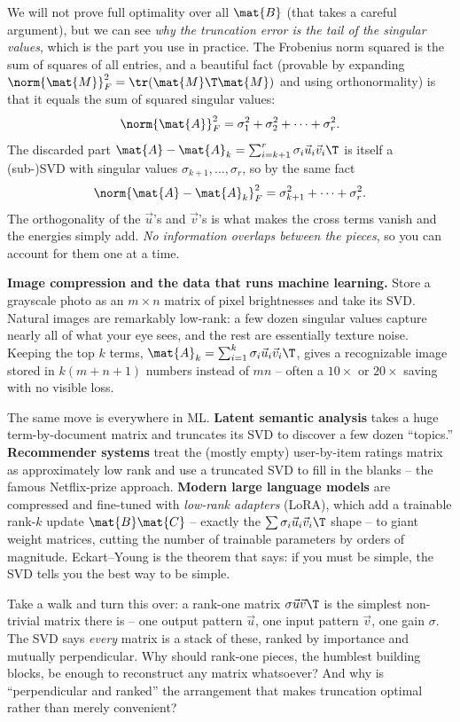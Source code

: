 We will not prove full optimality over all $\mat{B}$ (that takes a careful
argument), but we can see \emph{why the truncation error is the tail of the
singular values}, which is the part you use in practice. The Frobenius norm
squared is the sum of squares of all entries, and a beautiful fact (provable by
expanding $\norm{\mat{M}}_F^2 = \tr(\mat{M}\T\mat{M})$ and using orthonormality)
is that it equals the sum of squared singular values:
\[
  \norm{\mat{A}}_F^2 = \sigma_1^2 + \sigma_2^2 + \cdots + \sigma_r^2.
\]
The discarded part $\mat{A} - \mat{A}_k = \sum_{i=k+1}^r \sigma_i\vec{u}_i\vec{v}_i\T$
is itself a (sub-)SVD with singular values $\sigma_{k+1},\dots,\sigma_r$, so by
the same fact
\[
  \norm{\mat{A} - \mat{A}_k}_F^2 = \sigma_{k+1}^2 + \cdots + \sigma_r^2.
\]
The orthogonality of the $\vec{u}$'s and $\vec{v}$'s is what makes the cross terms
vanish and the energies simply add. \emph{No information overlaps between the
pieces}, so you can account for them one at a time.

\begin{applicationbox}
\textbf{Image compression and the data that runs machine learning.} Store a
grayscale photo as an $m\times n$ matrix of pixel brightnesses and take its SVD.
Natural images are remarkably low-rank: a few dozen singular values capture nearly
all of what your eye sees, and the rest are essentially texture noise. Keeping the
top $k$ terms, $\mat{A}_k = \sum_{i=1}^k \sigma_i\vec{u}_i\vec{v}_i\T$, gives a
recognizable image stored in $k(m+n+1)$ numbers instead of $mn$ -- often a $10\times$
or $20\times$ saving with no visible loss.

The same move is everywhere in ML. \textbf{Latent semantic analysis} takes a
huge term-by-document matrix and truncates its SVD to discover a few dozen
``topics.'' \textbf{Recommender systems} treat the (mostly empty) user-by-item
ratings matrix as approximately low rank and use a truncated SVD to fill in the
blanks -- the famous Netflix-prize approach. \textbf{Modern large language
models} are compressed and fine-tuned with \emph{low-rank adapters} (LoRA), which
add a trainable rank-$k$ update $\mat{B}\mat{C}$ -- exactly the
$\sum \sigma_i \vec{u}_i\vec{v}_i\T$ shape -- to giant weight matrices, cutting the
number of trainable parameters by orders of magnitude. Eckart--Young is the
theorem that says: if you must be simple, the SVD tells you the best way to be
simple.
\end{applicationbox}

\begin{walkbox}
Take a walk and turn this over: a rank-one matrix $\sigma\vec{u}\vec{v}\T$ is the
simplest non-trivial matrix there is -- one output pattern $\vec{u}$, one input
pattern $\vec{v}$, one gain $\sigma$. The SVD says \emph{every} matrix is a stack
of these, ranked by importance and mutually perpendicular. Why should rank-one
pieces, the humblest building blocks, be enough to reconstruct any matrix
whatsoever? And why is ``perpendicular and ranked'' the arrangement that makes
truncation optimal rather than merely convenient?
\end{walkbox}

